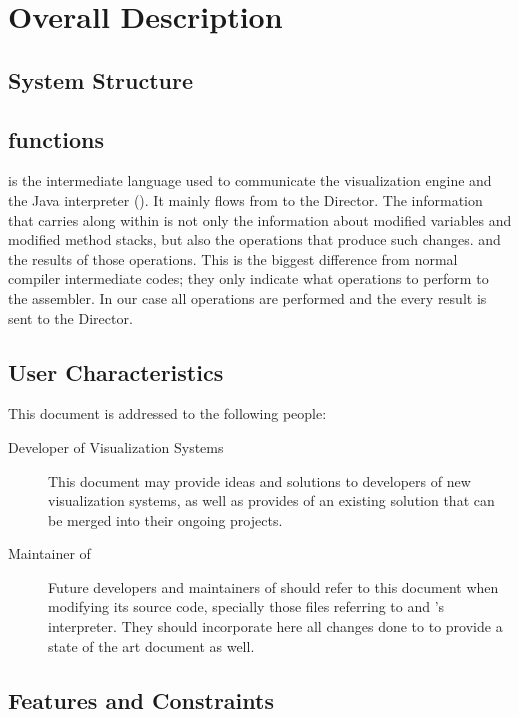 \chapter{Overall Description}
\label{ch:overall}

\section{\jel{} System Structure}
\label{sec:structure}

\section{\mcode{} functions}
\label{sec:functions}
\mcode{} is the intermediate language used to communicate the visualization engine and the Java interpreter (\djava{}). It mainly flows from \djava{}to the Director.  The information that carries along within is not only the information about modified variables and modified method stacks, but also the operations that produce such changes. and the results of those operations. This is the biggest difference from normal compiler intermediate codes; they only indicate what operations to perform to the assembler. In our case all operations are performed and the every result is sent to the Director.

\section{User Characteristics}
\label{sec:users}

This document is addressed to the following people:

\begin{description}
	\item[Developer of Visualization Systems] This document may provide ideas and solutions to developers of new visualization systems, as well as provides of an existing solution that can be merged into their ongoing projects.
	
	\item[Maintainer of \jel{}] Future developers and maintainers of \jel{} should refer to this document when modifying its source code, specially those files referring to \djava{} and \jel{}'s interpreter. They should incorporate here all changes done to \mcode{} to provide a state of the art document as well. 
	
\end{description}

\section{Features and Constraints}
\label{sec:features}

